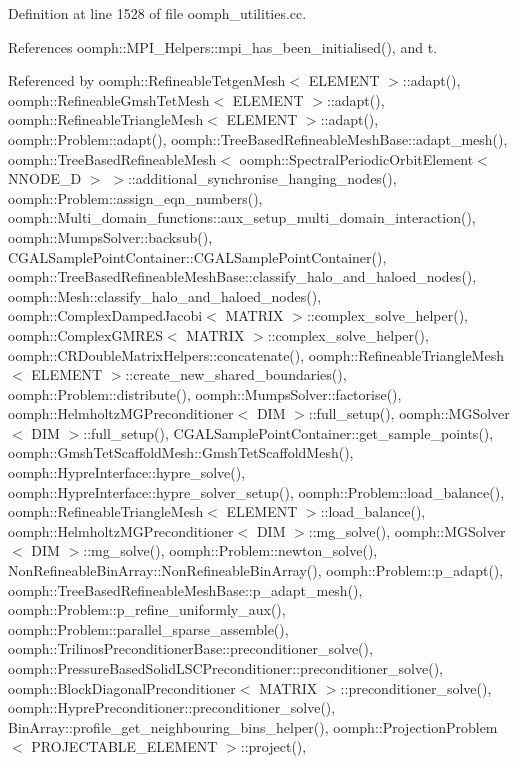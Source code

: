 Definition at line 1528 of file oomph\+\_\+utilities.\+cc.



References oomph\+::\+M\+P\+I\+\_\+\+Helpers\+::mpi\+\_\+has\+\_\+been\+\_\+initialised(), and t.



Referenced by oomph\+::\+Refineable\+Tetgen\+Mesh$<$ E\+L\+E\+M\+E\+N\+T $>$\+::adapt(), oomph\+::\+Refineable\+Gmsh\+Tet\+Mesh$<$ E\+L\+E\+M\+E\+N\+T $>$\+::adapt(), oomph\+::\+Refineable\+Triangle\+Mesh$<$ E\+L\+E\+M\+E\+N\+T $>$\+::adapt(), oomph\+::\+Problem\+::adapt(), oomph\+::\+Tree\+Based\+Refineable\+Mesh\+Base\+::adapt\+\_\+mesh(), oomph\+::\+Tree\+Based\+Refineable\+Mesh$<$ oomph\+::\+Spectral\+Periodic\+Orbit\+Element$<$ N\+N\+O\+D\+E\+\_\+D $>$ $>$\+::additional\+\_\+synchronise\+\_\+hanging\+\_\+nodes(), oomph\+::\+Problem\+::assign\+\_\+eqn\+\_\+numbers(), oomph\+::\+Multi\+\_\+domain\+\_\+functions\+::aux\+\_\+setup\+\_\+multi\+\_\+domain\+\_\+interaction(), oomph\+::\+Mumps\+Solver\+::backsub(), C\+G\+A\+L\+Sample\+Point\+Container\+::\+C\+G\+A\+L\+Sample\+Point\+Container(), oomph\+::\+Tree\+Based\+Refineable\+Mesh\+Base\+::classify\+\_\+halo\+\_\+and\+\_\+haloed\+\_\+nodes(), oomph\+::\+Mesh\+::classify\+\_\+halo\+\_\+and\+\_\+haloed\+\_\+nodes(), oomph\+::\+Complex\+Damped\+Jacobi$<$ M\+A\+T\+R\+I\+X $>$\+::complex\+\_\+solve\+\_\+helper(), oomph\+::\+Complex\+G\+M\+R\+E\+S$<$ M\+A\+T\+R\+I\+X $>$\+::complex\+\_\+solve\+\_\+helper(), oomph\+::\+C\+R\+Double\+Matrix\+Helpers\+::concatenate(), oomph\+::\+Refineable\+Triangle\+Mesh$<$ E\+L\+E\+M\+E\+N\+T $>$\+::create\+\_\+new\+\_\+shared\+\_\+boundaries(), oomph\+::\+Problem\+::distribute(), oomph\+::\+Mumps\+Solver\+::factorise(), oomph\+::\+Helmholtz\+M\+G\+Preconditioner$<$ D\+I\+M $>$\+::full\+\_\+setup(), oomph\+::\+M\+G\+Solver$<$ D\+I\+M $>$\+::full\+\_\+setup(), C\+G\+A\+L\+Sample\+Point\+Container\+::get\+\_\+sample\+\_\+points(), oomph\+::\+Gmsh\+Tet\+Scaffold\+Mesh\+::\+Gmsh\+Tet\+Scaffold\+Mesh(), oomph\+::\+Hypre\+Interface\+::hypre\+\_\+solve(), oomph\+::\+Hypre\+Interface\+::hypre\+\_\+solver\+\_\+setup(), oomph\+::\+Problem\+::load\+\_\+balance(), oomph\+::\+Refineable\+Triangle\+Mesh$<$ E\+L\+E\+M\+E\+N\+T $>$\+::load\+\_\+balance(), oomph\+::\+Helmholtz\+M\+G\+Preconditioner$<$ D\+I\+M $>$\+::mg\+\_\+solve(), oomph\+::\+M\+G\+Solver$<$ D\+I\+M $>$\+::mg\+\_\+solve(), oomph\+::\+Problem\+::newton\+\_\+solve(), Non\+Refineable\+Bin\+Array\+::\+Non\+Refineable\+Bin\+Array(), oomph\+::\+Problem\+::p\+\_\+adapt(), oomph\+::\+Tree\+Based\+Refineable\+Mesh\+Base\+::p\+\_\+adapt\+\_\+mesh(), oomph\+::\+Problem\+::p\+\_\+refine\+\_\+uniformly\+\_\+aux(), oomph\+::\+Problem\+::parallel\+\_\+sparse\+\_\+assemble(), oomph\+::\+Trilinos\+Preconditioner\+Base\+::preconditioner\+\_\+solve(), oomph\+::\+Pressure\+Based\+Solid\+L\+S\+C\+Preconditioner\+::preconditioner\+\_\+solve(), oomph\+::\+Block\+Diagonal\+Preconditioner$<$ M\+A\+T\+R\+I\+X $>$\+::preconditioner\+\_\+solve(), oomph\+::\+Hypre\+Preconditioner\+::preconditioner\+\_\+solve(), Bin\+Array\+::profile\+\_\+get\+\_\+neighbouring\+\_\+bins\+\_\+helper(), oomph\+::\+Projection\+Problem$<$ P\+R\+O\+J\+E\+C\+T\+A\+B\+L\+E\+\_\+\+E\+L\+E\+M\+E\+N\+T $>$\+::project(), 